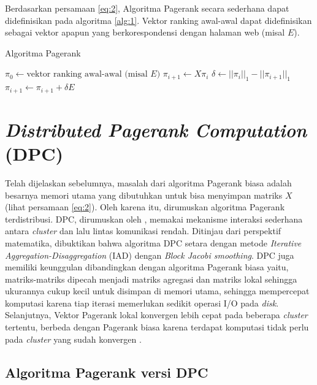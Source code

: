 Berdasarkan persamaan \ref{eq:2}, Algoritma Pagerank secara sederhana dapat didefinisikan pada algoritma \ref{alg:1}. Vektor ranking awal-awal dapat didefinisikan sebagai vektor apapun yang berkorespondensi dengan halaman web (misal $E$). 

\begin{breakablealgorithm}
\label{alg:1}
\caption{Algoritma Pagerank \citep{ilprints422}}
\begin{algorithmic}[1]
  \State $\pi_0 \gets \text{vektor ranking awal-awal (misal $E$)}$
  \Do
    \State $\pi_{i+1} \gets X\pi_i$
    \State $\delta \gets ||\pi_i||_1 - ||\pi_{i+1}||_1$
    \State $\pi_{i+1} \gets \pi_{i+1} + \delta E$
\end{algorithmic}
\end{breakablealgorithm}

\section{\textit{Distributed Pagerank Computation} (DPC)}

Telah dijelaskan sebelumnya, masalah dari algoritma Pagerank biasa adalah besarnya memori utama yang dibutuhkan untuk bisa menyimpan matriks $X$ (lihat persamaan \ref{eq:2}). Oleh karena itu, dirumuskan algoritma Pagerank terdistribusi. DPC, dirumuskan oleh \citet{zhuetal2005distributedPagerank}, memakai mekanisme interaksi sederhana antara \textit{cluster} dan lalu lintas komunikasi rendah. Ditinjau dari perspektif matematika, dibuktikan bahwa algoritma DPC setara dengan metode \textit{Iterative Aggregation-Disaggregation} (IAD) dengan \textit{Block Jacobi smoothing}. DPC juga memiliki keunggulan dibandingkan dengan algoritma Pagerank biasa yaitu, matriks-matriks dipecah menjadi matriks agregasi dan matriks lokal sehingga ukurannya cukup kecil untuk disimpan di memori utama, sehingga mempercepat komputasi karena tiap iterasi memerlukan sedikit operasi I/O pada \textit{disk}. Selanjutnya, Vektor Pagerank lokal konvergen lebih cepat pada beberapa \textit{cluster} tertentu, berbeda dengan Pagerank biasa karena terdapat komputasi tidak perlu pada \textit{cluster} yang sudah konvergen \citep{zhuetal2005distributedPagerank}.

\subsection{Algoritma Pagerank versi DPC}

